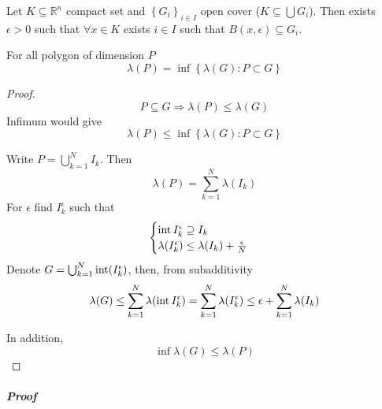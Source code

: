 \begin{lemma}
Let $K\subseteq \mathbb{R}^n$ compact set and $\left\{ G_i \right\}_{i\in I}$ open cover ($K\subseteq \bigcup G_i$). Then exists $\epsilon>0$ such that $\forall x\in K$ exists $i\in I$ such that $B(x,\epsilon) \subseteq G_i$.
\end{lemma}
\begin{lemma} \label{lemma_poly_inf}
	For all polygon of dimension $P$ 
	$$\lambda(P) = \inf \left\{ \lambda(G) : P\subset G  \right\}$$

\end{lemma}
	\begin{proof}
	$$P \subseteq G \Rightarrow \lambda(P) \leq \lambda(G)$$
	Infimum would give
	$$\lambda(P) \leq \inf \left\{ \lambda(G) : P\subset G  \right\}$$
	
	
	Write $P = \bigcup_{k=1}^N I_k$. Then
	$$\lambda(P)  =\sum_{k=1}^N \lambda(I_k)$$
	For $\epsilon$ find $I_k^\epsilon$ such that
	$$\begin{cases}
	\operatorname{int} I_k^\epsilon \supseteq I_k\\
	\lambda(I_k^\epsilon) \leq \lambda(I_k) + \frac{\epsilon}{N}
	\end{cases}$$
	Denote $G = \bigcup_{k=1}^N \operatorname{int} (I_k^\epsilon)$, then, from subadditivity
	$$\lambda(G) \leq \sum_{k=1}^N \lambda (\operatorname{int} I_k^\epsilon) = \sum_{k=1}^N \lambda (I_k^\epsilon) \leq \epsilon + \sum_{k=1}^N \lambda(I_k) $$
	
	In addition,
	$$\inf \lambda(G) \leq \lambda(P) $$
\end{proof}
\subparagraph{Proof} %
